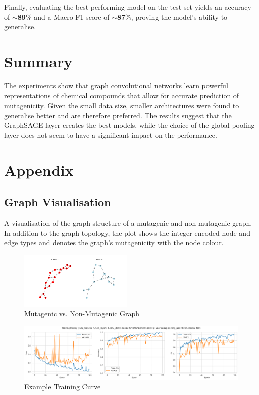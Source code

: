 \documentclass[10pt,conference,compsocconf]{ieee}
\begin{document}
Finally, evaluating the best-performing model on the test set yields an accuracy
of $\sim\mathbf{89}\%$ and a Macro F1 score of $\sim\mathbf{87}\%$, proving the
model's ability to generalise.

\section{Summary}

The experiments show that graph convolutional networks learn powerful
representations of chemical compounds that allow for accurate prediction of
mutagenicity. Given the small data size, smaller architectures were found to
generalise better and are therefore preferred. The results suggest that the
GraphSAGE layer creates the best models, while the choice of the global pooling
layer does not seem to have a significant impact on the performance.

\newpage



\section{Appendix}

\subsection{Graph Visualisation}

A visualisation of the graph structure of a mutagenic and non-mutagenic graph.
In addition to the graph topology, the plot shows the integer-encoded node and
edge types and denotes the graph's mutagenicity with the node colour.

\begin{figure}[h!]
  \includegraphics[width=0.48\textwidth]{../plots/graphs.png}
  \caption{Mutagenic vs. Non-Mutagenic Graph}
  \label{fig:graph}
\end{figure}


\begin{figure}[b]
  \centering
  \includegraphics[width=\textwidth]{../plots/training.png}
  \caption{Example Training Curve}
  \label{fig:training}
\end{figure}
\end{document}
